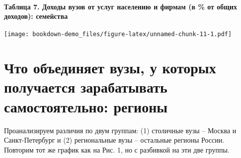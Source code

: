 \documentclass[]{book}
\let\oldparagraph\paragraph
\renewcommand{\paragraph}[1]{\oldparagraph{#1}\mbox{}}
\begin{document}
\hypertarget{ux442ux430ux431ux43bux438ux446ux430-7.-ux434ux43eux445ux43eux434ux44b-ux432ux443ux437ux43eux432-ux43eux442-ux443ux441ux43bux443ux433-ux43dux430ux441ux435ux43bux435ux43dux438ux44e-ux438-ux444ux438ux440ux43cux430ux43c-ux432-ux43eux442-ux43eux431ux449ux438ux445-ux434ux43eux445ux43eux434ux43eux432-ux441ux435ux43cux435ux439ux441ux442ux432ux430}{%
\paragraph{Таблица 7. Доходы вузов от услуг населению и фирмам (в \% от общих доходов): семейства}\label{ux442ux430ux431ux43bux438ux446ux430-7.-ux434ux43eux445ux43eux434ux44b-ux432ux443ux437ux43eux432-ux43eux442-ux443ux441ux43bux443ux433-ux43dux430ux441ux435ux43bux435ux43dux438ux44e-ux438-ux444ux438ux440ux43cux430ux43c-ux432-ux43eux442-ux43eux431ux449ux438ux445-ux434ux43eux445ux43eux434ux43eux432-ux441ux435ux43cux435ux439ux441ux442ux432ux430}}

\texttt{[image: bookdown-demo\_files/figure-latex/unnamed-chunk-11-1.pdf]}

\hypertarget{ux447ux442ux43e-ux43eux431ux44aux435ux434ux438ux43dux44fux435ux442-ux432ux443ux437ux44b-ux443-ux43aux43eux442ux43eux440ux44bux445-ux43fux43eux43bux443ux447ux430ux435ux442ux441ux44f-ux437ux430ux440ux430ux431ux430ux442ux44bux432ux430ux442ux44c-ux441ux430ux43cux43eux441ux442ux43eux44fux442ux435ux43bux44cux43dux43e-ux440ux435ux433ux438ux43eux43dux44b}{%
\section{Что объединяет вузы, у которых получается зарабатывать самостоятельно: регионы}\label{ux447ux442ux43e-ux43eux431ux44aux435ux434ux438ux43dux44fux435ux442-ux432ux443ux437ux44b-ux443-ux43aux43eux442ux43eux440ux44bux445-ux43fux43eux43bux443ux447ux430ux435ux442ux441ux44f-ux437ux430ux440ux430ux431ux430ux442ux44bux432ux430ux442ux44c-ux441ux430ux43cux43eux441ux442ux43eux44fux442ux435ux43bux44cux43dux43e-ux440ux435ux433ux438ux43eux43dux44b}}

Проанализируем различия по двум группам: (1) столичные вузы -- Москва и Санкт-Петербург и (2) региональные вузы -- остальные регионы России. Повторим тот же график как на Рис. 1, но с разбивкой на эти две группы.
\end{document}
